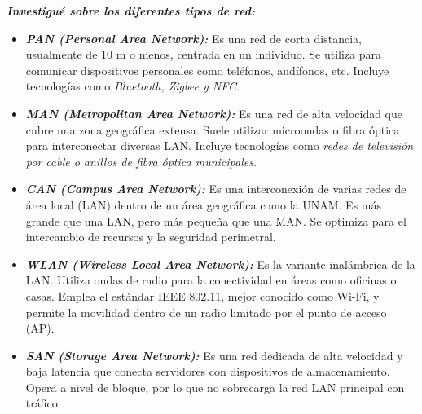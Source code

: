 \textbf{\textit{Investigué sobre los diferentes tipos de red:}}

\begin{itemize}
    \item \textbf{\textit{PAN (Personal Area Network):}} Es una red de corta distancia, usualmente de 10 m o menos, centrada en un individuo. Se utiliza para comunicar dispositivos personales como teléfonos, audífonos, etc. Incluye tecnologías como \textit{Bluetooth, Zigbee y NFC}.

    \item \textbf{\textit{MAN (Metropolitan Area Network):}} Es una red de alta velocidad que cubre una zona geográfica extensa. Suele utilizar microondas o fibra óptica para interconectar diversas LAN. Incluye tecnologías como \textit{redes de televisión por cable o anillos de fibra óptica municipales}.

    \item \textbf{\textit{CAN (Campus Area Network):}} Es una interconexión de varias redes de área local (LAN) dentro de un área geográfica como la UNAM. Es más grande que una LAN, pero más pequeña que una MAN. Se optimiza para el intercambio de recursos y la seguridad perimetral.

    \item \textbf{\textit{WLAN (Wireless Local Area Network):}} Es la variante inalámbrica de la LAN. Utiliza ondas de radio para la conectividad en áreas como oficinas o casas. Emplea el estándar IEEE 802.11, mejor conocido como Wi-Fi, y permite la movilidad dentro de un radio limitado por el punto de acceso (AP).

    \item \textbf{\textit{SAN (Storage Area Network):}} Es una red dedicada de alta velocidad y baja latencia que conecta servidores con dispositivos de almacenamiento. Opera a nivel de bloque, por lo que no sobrecarga la red LAN principal con tráfico.
\end{itemize}

\cite{tanenbaum2021networks}
